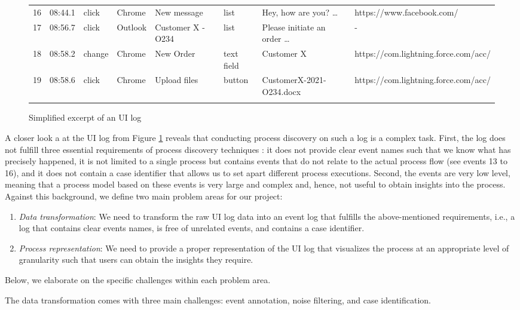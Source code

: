 \begin{figure}[h!]
\begin{adjustbox}{max width=\textwidth}
\begin{tabular}{llllllll}
16&08:44.1&click&Chrome&New message&list&Hey, how are you? …&https://www.facebook.com/\\\noalign{\smallskip}
17&08:56.7&click&Outlook&Customer X - O234&list&Please initiate an order …&-\\\noalign{\smallskip}
18&08:58.2&change&Chrome&New Order&text field&Customer X&https://com.lightning.force.com/acc/\\\noalign{\smallskip}
19&08:58.6&click&Chrome&Upload files&button&CustomerX-2021-O234.docx&https://com.lightning.force.com/acc/\\\noalign{\smallskip}
\hline\noalign{\smallskip}
\end{tabular}
\end{adjustbox}
\caption{Simplified excerpt of an UI log}
\label{fig:example}
\end{figure}

A closer look a at the UI log from Figure \ref{fig:example} reveals that conducting process discovery on such a log is a complex task. First, the log does not fulfill three essential requirements of process discovery techniques \cite{van2016data}: it does not provide clear event names such that we know what has precisely happened, it is not limited to a single process but contains events that do not relate to the actual process flow (see events 13 to 16), and it does not contain a case identifier that allows us to set apart different process executions. Second, the events are very low level, meaning that a process model based on these events is very large and complex and, hence, not useful to obtain insights into the process. Against this background, we define two main problem areas for our project: 
\begin{enumerate}
\item \textit{Data transformation}: We need to transform the raw UI log data into an event log that fulfills the above-mentioned requirements, i.e., a log that contains clear events names, is free of unrelated events, and contains a case identifier.   
\item \textit{Process representation}: We need to provide a proper representation of the UI log that visualizes the process at an appropriate level of granularity such that users can obtain the insights they require. 
\end{enumerate}

Below, we elaborate on the specific challenges within each problem area.

 The data transformation comes with three main challenges: event annotation, noise filtering, and case identification. 

